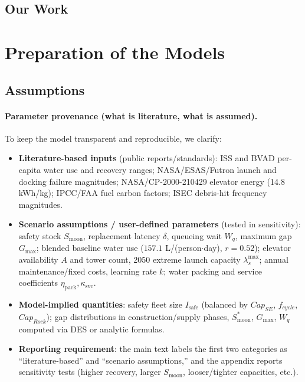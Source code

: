 ﻿\documentclass{mcmthesis}
\begin{document}
\subsection{Our Work}

\section{Preparation of the Models}
\subsection{Assumptions}
\paragraph{Parameter provenance (what is literature, what is assumed).}
To keep the model transparent and reproducible, we clarify:\\[-0.4em]
\begin{itemize}
    \item \textbf{Literature-based inputs} (public reports/standards): ISS and BVAD per-capita water use and recovery ranges; NASA/ESAS/Futron launch and docking failure magnitudes; NASA/CP-2000-210429 elevator energy (14.8 kWh/kg); IPCC/FAA fuel carbon factors; ISEC debris-hit frequency magnitudes.
    \item \textbf{Scenario assumptions / user-defined parameters} (tested in sensitivity): safety stock $S_{\text{moon}}$, replacement latency $\delta$, queueing wait $W_q$, maximum gap $G_{\max}$; blended baseline water use ($157.1$ L/(person$\cdot$day), $r=0.52$); elevator availability $A$ and tower count, 2050 extreme launch capacity $\lambda_s^{\max}$; annual maintenance/fixed costs, learning rate $k$; water packing and service coefficients $\eta_{\text{pack}},\kappa_{\text{svc}}$.
    \item \textbf{Model-implied quantities}: safety fleet size $I_{\text{safe}}$ (balanced by $Cap_{SE}$, $f_{cycle}$, $Cap_{Rock}$); gap distributions in construction/supply phases, $S_{\text{moon}}^{*}$, $G_{\max}$, $W_q$ computed via DES or analytic formulas.
    \item \textbf{Reporting requirement}: the main text labels the first two categories as ``literature-based'' and ``scenario assumptions,'' and the appendix reports sensitivity tests (higher recovery, larger $S_{\text{moon}}$, looser/tighter capacities, etc.).
\end{itemize}
\end{document}
